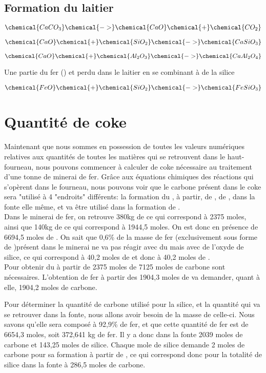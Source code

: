 \documentclass[11pt,a4paper]{report}
\begin{document}
\subsection{Formation du laitier}
\begin{center}
\[
\chemical{CaCO_3}
\chemical{->}
\chemical{CaO}\chemical{+}\chemical{CO_2}
\]

\[
\chemical{CaO}\chemical{+}\chemical{SiO_2}
\chemical{->}
\chemical{CaSiO_3}
\]

\[
\chemical{CaO}\chemical{+}\chemical{Al_2O_3}
\chemical{->}
\chemical{CaAl_2O_4}
\]

Une partie du fer () et perdu dans le laitier en se combinant à de la silice

\[
\chemical{FeO}\chemical{+}\chemical{SiO_2}
\chemical{->}
\chemical{FeSiO_3}
\]
\end{center}

\section{Quantité de coke}

Maintenant que nous sommes en possession de toutes les valeurs numériques relatives aux quantités de toutes les matières qui se retrouvent dans le haut-fourneau, nous pouvons commencer à calculer de coke nécessaire au traitement d'une tonne de minerai de fer. Grâce aux équations chimiques des réactions qui s'opèrent dans le fourneau, nous pouvons voir que le carbone présent dans le coke sera "utilisé à 4 "endroits" différents: la formation du , à partir, de , de , dans la fonte elle même, et va être utilisé dans la formation de \chemical{+}.\\

Dans le minerai de fer, on retrouve 380kg de  ce qui correspond à 2375 moles, ainsi que 140kg de  ce qui correspond à 1944,5 moles. On est donc en présence de 6694,5 moles de . On sait que 0,6\% de la masse de fer (exclusivement sous forme de )présent dans le minerai ne va pas réagir avec du  mais avec de l'oxyde de silice, ce qui correspond à 40,2 moles de  et donc à 40,2 moles de .\\

Pour obtenir du  à partir de 2375 moles de  7125 moles de carbone sont nécessaires. L'obtention de fer à partir des 1904,3 moles de  va demander, quant à elle, 1904,2 moles de carbone.

Pour déterminer la quantité de carbone utilisé pour la silice, et la quantité qui va se retrouver dans la fonte, nous allons avoir besoin de la masse de celle-ci. Nous savons qu'elle sera composé à 92,9\% de fer, et que cette quantité de fer est de 6654,3 moles, soit 372,641 kg de fer. Il y a donc dans la fonte 2039 moles de carbone et 143,25 moles de silice. Chaque mole de silice demande 2 moles de carbone pour sa formation à partir de , ce qui correspond donc pour la totalité de silice dans la fonte à 286,5 moles de carbone.


 
\end{document}
